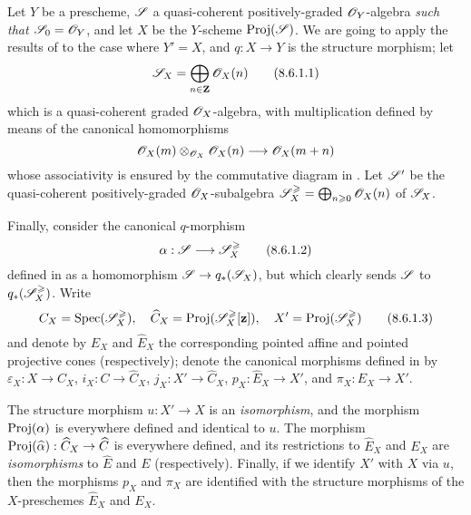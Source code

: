 \begin{env}[8.6.1]
\label{II.8.6.1}
Let $Y$ be a prescheme, $\mathscr{S}$ a quasi-coherent positively-graded $\mathscr{O}_Y$-algebra \emph{such that $\mathscr{S}_0=\mathscr{O}_Y$}, and let $X$ be the $Y$-scheme $\operatorname{Proj}(\mathscr{S})$.
We are going to apply the results of  to the case where $Y'=X$, and $q:X\to Y$ is the structure morphism;
let
\[
\label{II.8.6.1.1}
  \mathscr{S}_X=\bigoplus_{n\in\mathbf{Z}}\mathscr{O}_X(n)
  \tag{8.6.1.1}
\]
which is a quasi-coherent graded $\mathscr{O}_X$-algebra, with multiplication defined by means of the canonical homomorphisms 
\[
  \sh{O}_X(m)\otimes_{\sh{O}_X}\sh{O}_X(n)\to\sh{O}_X(m+n)
\]
whose associativity is ensured by the commutative diagram in .
Let $\mathscr{S}'$ be the quasi-coherent positively-graded $\mathscr{O}_X$-subalgebra $\mathscr{S}_X^\geqslant=\bigoplus_{n\geqslant0}\mathscr{O}_X(n)$ of $\mathscr{S}_X$.

Finally, consider the canonical $q$-morphism
\[
\label{II.8.6.1.2}
  \alpha: \sh{S} \to \sh{S}_X^\geq
\tag{8.6.1.2}
\]
defined in  as a homomorphism $\sh{S}\to q_*(\sh{S}_X)$, but which clearly sends $\mathscr{S}$ to $q_*(\mathscr{S}_X^\geqslant)$.
Write
\[
\label{II.8.6.1.3}
  C_X = \operatorname{Spec}(\mathscr{S}_X^\geqslant),
  \quad
  \widehat{C}_X = \operatorname{Proj}(\mathscr{S}_X^\geqslant[\mathbf{z}]),
  \quad
  X' = \operatorname{Proj}(\mathscr{S}_X^\geqslant)
\tag{8.6.1.3}
\]
and denote by $E_X$ and $\widehat{E}_X$ the corresponding pointed affine and pointed projective cones (respectively);
denote the canonical morphisms defined in  by $\varepsilon_X:X\to C_X$, $i_X:C\to\widehat{C}_X$, $j_X:X'\to\widehat{C}_X$, $p_X:\widehat{E}_X\to X'$, and $\pi_X:E_X\to X'$.
\end{env}

\begin{proposition}[8.6.2]
\label{II.8.6.2}
The structure morphism $u:X'\to X$ is an \emph{isomorphism}, and the morphism $\operatorname{Proj}(\alpha)$ is everywhere defined and identical to $u$.
The morphism $\Proj(\widehat{\alpha}):\widehat{C}_X\to\widehat{C}$ is everywhere defined, and its restrictions to $\widehat{E}_X$ and $E_X$ are \emph{isomorphisms} to $\widehat{E}$ and $E$ (respectively).
Finally, if we identify $X'$ with $X$ via $u$, then the morphisms $p_X$ and $\pi_X$ are identified with the structure morphisms of the $X$-preschemes $\widehat{E}_X$ and $E_X$.
\end{proposition}

